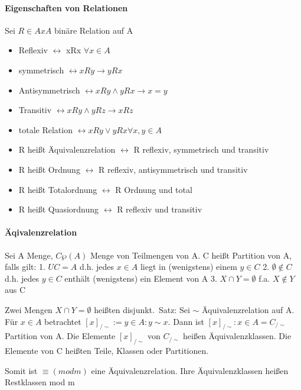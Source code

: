 \documentclass[a4paper]{article}
\begin{document}
\begin{multicols}{3}
    \paragraph{Eigenschaften von Relationen}
    Sei $R\in AxA$ binäre Relation auf A
    \begin{itemize}
        \item Reflexiv $\leftrightarrow$ xRx $\forall x \in A$
        \item symmetrisch $\leftrightarrow xRy \rightarrow yRx$
        \item Antisymmetrisch $\leftrightarrow xRy \wedge yRx \rightarrow x=y$
        \item Transitiv $\leftrightarrow xRy \wedge yRz \rightarrow xRz$
        \item totale Relation $\leftrightarrow xRy \vee yRx  \forall x,y \in A$
    \end{itemize}
    \begin{itemize}
        \item R heißt Äquivalenzrelation $\leftrightarrow$ R reflexiv, symmetrisch und transitiv
        \item R heißt Ordnung $\leftrightarrow$ R reflexiv, antisymmetrisch und transitiv
        \item R heißt Totalordnung $\leftrightarrow$ R Ordnung und total
        \item R heißt Quasiordnung $\leftrightarrow$ R reflexiv und transitiv
    \end{itemize}
    
    \paragraph{Äqivalenzrelation}
    Sei A Menge, $C\wp (A)$ Menge von Teilmengen von A. C heißt Partition von A, falls gilt:
    1. $UC=A$ d.h. jedes $x\in A$ liegt in (wenigstens) einem $y\in C$
    2. $\emptyset \not \in C$ d.h. jedes $y\in C$ enthält (wenigstens) ein Element von A
    3. $X \cap Y = \emptyset$ f.a. $X\not \in Y$ aus C
    
    Zwei Mengen $X\cap Y = \emptyset$ heißten disjunkt.\
    Satz: Sei $\sim$ Äquivalenzrelation auf A. Für $x\in A$ betrachtet $[x]_{/ \sim }:={y\in A: y \sim x}$. Dann ist ${[x]_{/ \sim }:x\in A}= C_{/ \sim }$ Partition von A. Die Elemente $[x]_{/ \sim }$ von $C_{/ \sim }$ heißen Äquivalenzklassen. Die Elemente von C heißten Teile, Klassen oder Partitionen.
    
    Somit ist $\equiv(mod m)$ eine Äquivalenzrelation. Ihre Äquivalenzklassen heißen Restklassen mod m
    

\end{multicols}
\end{document}
